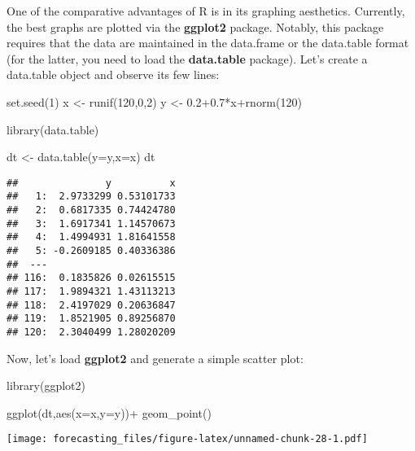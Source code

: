 \documentclass[
  oneside]{book}
\newenvironment{Shaded}{\begin{snugshade}}{\end{snugshade}}
\newcommand{\AttributeTok}[1]{\textcolor[rgb]{0.77,0.63,0.00}{#1}}
\newcommand{\DecValTok}[1]{\textcolor[rgb]{0.00,0.00,0.81}{#1}}
\newcommand{\FloatTok}[1]{\textcolor[rgb]{0.00,0.00,0.81}{#1}}
\newcommand{\FunctionTok}[1]{\textcolor[rgb]{0.00,0.00,0.00}{#1}}
\newcommand{\NormalTok}[1]{#1}
\newcommand{\OtherTok}[1]{\textcolor[rgb]{0.56,0.35,0.01}{#1}}
\newcommand{\SpecialCharTok}[1]{\textcolor[rgb]{0.00,0.00,0.00}{#1}}
\begin{document}
One of the comparative advantages of R is in its graphing aesthetics. Currently, the best graphs are plotted via the \textbf{ggplot2} package. Notably, this package requires that the data are maintained in the data.frame or the data.table format (for the latter, you need to load the \textbf{data.table} package). Let's create a data.table object and observe its few lines:

\begin{Shaded}
\begin{Highlighting}[]
\FunctionTok{set.seed}\NormalTok{(}\DecValTok{1}\NormalTok{)}
\NormalTok{x }\OtherTok{\textless{}{-}} \FunctionTok{runif}\NormalTok{(}\DecValTok{120}\NormalTok{,}\DecValTok{0}\NormalTok{,}\DecValTok{2}\NormalTok{)}
\NormalTok{y }\OtherTok{\textless{}{-}} \FloatTok{0.2+0.7}\SpecialCharTok{*}\NormalTok{x}\SpecialCharTok{+}\FunctionTok{rnorm}\NormalTok{(}\DecValTok{120}\NormalTok{)}

\FunctionTok{library}\NormalTok{(data.table)}

\NormalTok{dt }\OtherTok{\textless{}{-}} \FunctionTok{data.table}\NormalTok{(}\AttributeTok{y=}\NormalTok{y,}\AttributeTok{x=}\NormalTok{x)}
\NormalTok{dt}
\end{Highlighting}
\end{Shaded}

\begin{verbatim}
##               y          x
##   1:  2.9733299 0.53101733
##   2:  0.6817335 0.74424780
##   3:  1.6917341 1.14570673
##   4:  1.4994931 1.81641558
##   5: -0.2609185 0.40336386
##  ---                      
## 116:  0.1835826 0.02615515
## 117:  1.9894321 1.43113213
## 118:  2.4197029 0.20636847
## 119:  1.8521905 0.89256870
## 120:  2.3040499 1.28020209
\end{verbatim}

Now, let's load \textbf{ggplot2} and generate a simple scatter plot:

\begin{Shaded}
\begin{Highlighting}[]
\FunctionTok{library}\NormalTok{(ggplot2)}

\FunctionTok{ggplot}\NormalTok{(dt,}\FunctionTok{aes}\NormalTok{(}\AttributeTok{x=}\NormalTok{x,}\AttributeTok{y=}\NormalTok{y))}\SpecialCharTok{+}
  \FunctionTok{geom\_point}\NormalTok{()}
\end{Highlighting}
\end{Shaded}

\texttt{[image: forecasting\_files/figure-latex/unnamed-chunk-28-1.pdf]}
\end{document}
